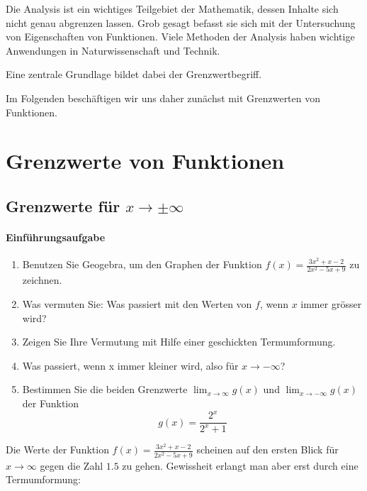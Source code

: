 Die Analysis ist ein wichtiges Teilgebiet der Mathematik, dessen Inhalte sich nicht genau abgrenzen lassen. Grob gesagt befasst sie sich mit der Untersuchung von Eigenschaften von Funktionen. Viele Methoden der Analysis haben wichtige Anwendungen in Naturwissenschaft und Technik.

Eine zentrale Grundlage bildet dabei der Grenzwertbegriff.

Im Folgenden beschäftigen wir uns daher zunächst mit Grenzwerten von Funktionen.

\section{Grenzwerte von Funktionen}
\subsection{Grenzwerte für $x \to \pm \infty$}
\paragraph{Einführungsaufgabe}
\begin{enumerate}
    \item Benutzen Sie Geogebra, um den Graphen der Funktion $f(x) = \frac{3x^2+x-2}{2x^2-5x+9}$ zu zeichnen.
    \item 	Was vermuten Sie: Was passiert mit den Werten von $f$, wenn $x$ immer grösser wird?
    \item Zeigen Sie Ihre Vermutung mit Hilfe einer geschickten Termumformung.
    \item Was passiert, wenn x immer kleiner wird, also für $x\rightarrow-\infty$?
    \item Bestimmen Sie die beiden Grenzwerte $\lim_{x\to \infty}g(x)$ und $\lim_{x\to -\infty}g(x)$ der Funktion
          \[g(x) =\dfrac{2^x}{2^x+1}\]
\end{enumerate}
\clearpage
Die Werte der Funktion $f(x) = \frac{3x^2+x-2}{2x^2-5x+9}$ scheinen auf den ersten Blick für $x \to \infty$ gegen die Zahl $1.5$ zu gehen. Gewissheit erlangt man aber erst durch eine Termumformung:

